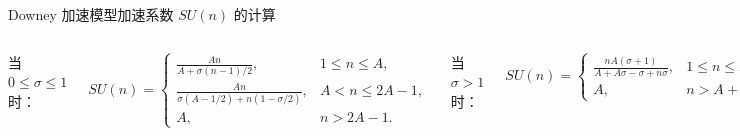 \begin{frame}{Downey 加速模型}{加速系数 $SU(n)$ 的计算}

    \begin{columns}


        当 $0 \leqslant \sigma \leqslant 1$ 时：

        \begin{equation*}
            SU(n)= \begin{cases}
                \frac{A n}{A + \sigma(n-1) / 2},                 & 1 \leqslant n \leqslant A, \\
                \frac{A n}{\sigma(A-1 / 2) + n(1 - \sigma / 2)}, & A < n \leqslant 2 A-1,     \\
                A,                                               & n > 2A - 1 .
            \end{cases}
        \end{equation*}

        当 $\sigma > 1$ 时：

        \begin{equation*}
            SU(n)= \begin{cases}
                \frac{n A(\sigma + 1)}{A + A \sigma - \sigma + n \sigma}, & 1 \leqslant n \leqslant A + A \sigma - \sigma, \\
                A,                                                        & n > A + A \sigma - \sigma .
            \end{cases}
        \end{equation*}

        其中 $n$ 为计算核心数.


        \begin{figure}
            \centering
            \includegraphics[scale=0.17]{pics/speedup_curve.png}
            \caption{Speedup curves for a range of values of $\sigma$ when $A = 64$}
        \end{figure}
    \end{columns}
\end{frame}

